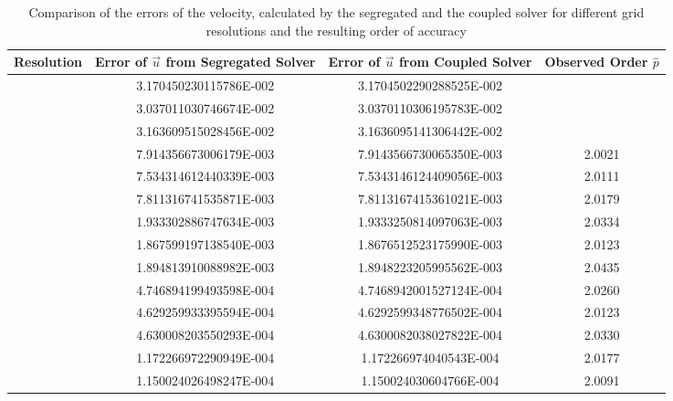 \begin{table}[h!]\centering
{}
  \caption{Comparison of the errors of the velocity, calculated by the segregated and the coupled solver for different grid resolutions and the resulting order of accuracy}
  \begin{tabular}{cccc}\toprule
    Resolution & Error of \(\vec{u}\) from Segregated Solver & Error of \(\vec{u}\) from Coupled Solver & Observed Order \(\hat{p}\) \\
    \midrule
    \rowcolor{tud0a}\multirow{3}{*}{}          &    3.170450230115786E-002 & 3.1704502290288525E-002 &  \\
    \rowcolor{tud0a}                           &    3.037011030746674E-002 & 3.0370110306195783E-002 &  \\
    \rowcolor{tud0a} \multirow{-3}{*}{8x8x8}   &    3.163609515028456E-002 & 3.1636095141306442E-002 &  \\ %
    \rowcolor{black!00}\multirow{3}{*}{}          &    7.914356673006179E-003 & 7.9143566730065350E-003 & 2.0021  \\
    \rowcolor{black!00}                           &    7.534314612440339E-003 & 7.5343146124409056E-003 & 2.0111  \\
    \rowcolor{black!00} \multirow{-3}{*}{16x16x16}&    7.811316741535871E-003 & 7.8113167415361021E-003 & 2.0179  \\ %
    \rowcolor{tud0a}\multirow{3}{*}{}          &    1.933302886747634E-003 & 1.9333250814097063E-003 & 2.0334  \\
    \rowcolor{tud0a}                           &    1.867599197138540E-003 & 1.8676512523175990E-003 & 2.0123  \\
    \rowcolor{tud0a} \multirow{-3}{*}{32x32x32}&    1.894813910088982E-003 & 1.8948223205995562E-003 & 2.0435  \\ %
    \rowcolor{black!00}\multirow{3}{*}{}          &    4.746894199493598E-004 & 4.7468942001527124E-004 & 2.0260 \\
    \rowcolor{black!00}                           &    4.629259933395594E-004 & 4.6292599348776502E-004 & 2.0123 \\
    \rowcolor{black!00} \multirow{-3}{*}{64x64x64}&    4.630008203550293E-004 & 4.6300082038027822E-004 & 2.0330 \\ %
    \rowcolor{tud0a}\multirow{3}{*}{}             & 1.172266972290949E-004 & 1.172266974040543E-004 & 2.0177  \\
    \rowcolor{tud0a}                              & 1.150024026498247E-004 & 1.150024030604766E-004 & 2.0091  \\

\end{tabular}
\end{table}
